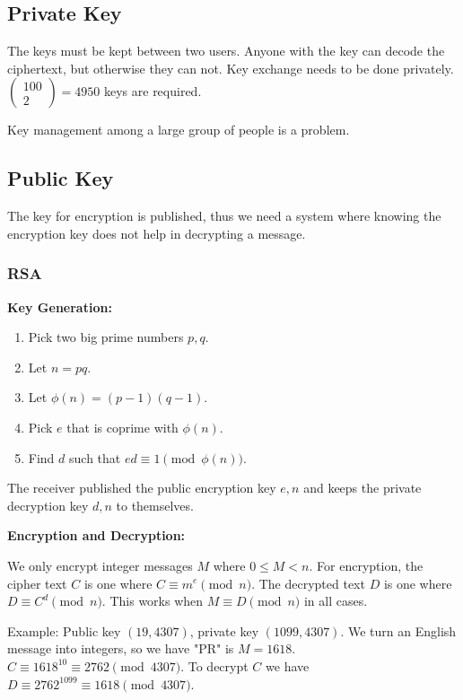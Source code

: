 \documentclass[12pt]{article}
\begin{document}
\subsection*{Private Key}
The keys must be kept between two users. Anyone with the key can decode the ciphertext, but otherwise they can not. Key exchange needs to be done privately. $\begin{pmatrix}100 \\ 2\end{pmatrix} = 4950$ keys are required.

Key management among a large group of people is a problem.

\subsection*{Public Key}
The key for encryption is published, thus we need a system where knowing the encryption key does not help in decrypting a message.

\subsubsection*{RSA}
{\bf Key Generation:}
\begin{enumerate}
\item Pick two big prime numbers $p, q$.
\item Let $n = pq$.
\item Let $\phi(n) = (p-1)(q-1)$.
\item Pick $e$ that is coprime with $\phi(n)$.
\item Find $d$ such that $ed \equiv 1 \pmod{\phi(n)}$.
\end{enumerate}

The receiver published the public encryption key $e, n$ and keeps the private decryption key $d, n$ to themselves.

{\bf Encryption and Decryption:}

We only encrypt integer messages $M$ where $0 \leq M < n$. For encryption, the cipher text $C$ is one where $C \equiv m^e \pmod{n}$. The decrypted text $D$ is one where $D \equiv C^d \pmod{n}$. This works when $M \equiv D \pmod n$ in all cases.

Example: Public key $(19, 4307)$, private key $(1099, 4307)$. We turn an English message into integers, so we have "PR" is $M = 1618$. $C \equiv 1618^{10} \equiv 2762 \pmod{4307}$. To decrypt $C$ we have $D \equiv 2762^{1099} \equiv 1618 \pmod{4307}$.

\end{document}
